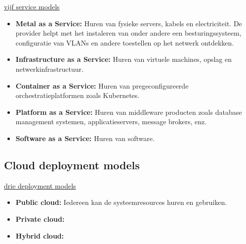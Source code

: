 \documentclass{report}
\begin{document}
	\underline{vijf service models}
	\begin{itemize}
		\item[\info] \textbf{Metal as a Service:} Huren van fysieke servers, kabels en electriciteit. De provider helpt met het instaleren van onder andere een besturingssysteem, configuratie van VLANs en andere toestellen op het netwerk ontdekken.
		\item[\info] \textbf{Infrastructure as a Service:} Huren van virtuele machines, opslag en netwerkinfrastructuur. 
		\item[\info] \textbf{Container as a Service:} Huren van pregeconfigureerde orchestratieplatformen zoals Kubernetes.
		\item[\info] \textbf{Platform as a Service:} Huren van middleware producten zoals database management systemen, applicatieservers, message brokers, enz. 
		\item[\info] \textbf{Software as a Service:} Huren van software.
	\end{itemize}

	\subsection{Cloud deployment models}
	\underline{drie deployment models}
	\begin{itemize}
		\item[\info] \textbf{Public cloud:} Iedereen kan de systeemresources huren en gebruiken. 
		\item[\info] \textbf{Private cloud:}
		\item[\info] \textbf{Hybrid cloud:}
	\end{itemize}
\end{document}
